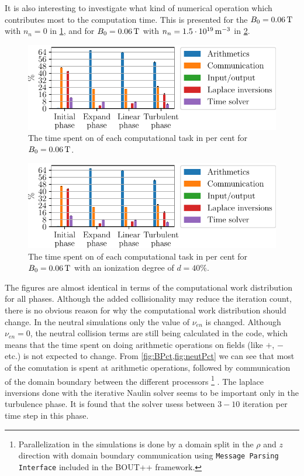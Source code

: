 It is also interesting to investigate what kind of numerical operation which contributes most to the computation time.
This is presented for the $B_0 = 0.06\, \text{T}$ with $n_n=0$ in \cref{fig:BPct}, and for $B_0 = 0.06\, \text{T}$ with $n_n=1.5\cdot10^{19}\, \text{m}^{-3}$ in \cref{fig:neutPct}.
%
\begin{figure}[htb]
    \centering
    \includegraphics{fig/results/performance/PercentagesBScanB00_06}
    \caption{The time spent on of each computational task in per cent for $B_0=0.06\, \text{T}$.}
    \label{fig:BPct}
\end{figure}
%
%
\begin{figure}[htb]
    \centering
    \includegraphics{fig/results/performance/PercentagesNeutralScanB00_06Nn1_5e+19}
    \caption{The time spent on of each computational task in per cent for $B_0=0.06\, \text{T}$ with an ionization degree of $d=40\%$.}
    \label{fig:neutPct}
\end{figure}
%
The figures are almost identical in terms of the computational work distribution for all phases.
Although the added collisionality may reduce the iteration count, there is no obvious reason for why the computational work distribution should change.
In the neutral simulations only the value of $\nu_{en}$ is changed.
Although $\nu_{en}=0$, the neutral collision terms are still being calculated in the code, which means that the time spent on doing arithmetic operations on fields (like $+$, $-$ etc.) is not expected to change.
From \cref{fig:BPct,fig:neutPct} we can see that most of the comutation is spent at arithmetic operations, followed by communication of the domain boundary between the different processors%
\footnote{Parallelization in the simulations is done by a domain split in the $\rho$ and $z$ direction with domain boundary communication using \texttt{Message Parsing Interface} included in the BOUT++ framework.}%
.
The laplace inversions done with the iterative Naulin solver seems to be important only in the turbulence phase.
It is found that the solver usess between $3-10$ iteration per time step in this phase.

